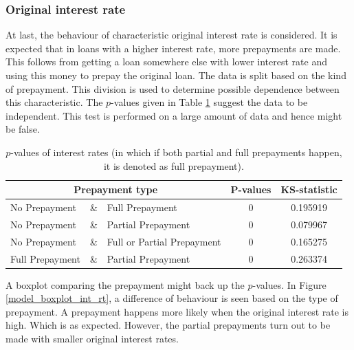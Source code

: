 \subsubsection{Original interest rate}
    At last, the behaviour of characteristic original interest rate is 
    considered. It is expected that in loans with a higher interest 
    rate, more prepayments are made. This follows from getting a 
    loan somewhere else with lower interest rate and using this 
    money to prepay the original loan. The data is split based 
    on the kind of prepayment. This division is used to determine 
    possible dependence between this characteristic. The $p$-values 
    given in Table \ref{model_Pvals_of_int} suggest the data to 
    be independent. This test is performed on a large amount of 
    data and hence might be false. 
    \begin{table}[H]
        \centering
            \begin{tabular}{lcl|c|c}
                \multicolumn{3}{c|}{Prepayment type} & P-values& KS-statistic \\\hline
                No Prepayment & \& & Full Prepayment & 0 & 0.195919\\
                No Prepayment & \& & Partial Prepayment & 0 & 0.079967\\
                No Prepayment & \& & Full or Partial Prepayment & 0 & 0.165275 \\
                Full Prepayment & \& & Partial Prepayment & 0 & 0.263374
		    \end{tabular}
            \caption{
                $p$-values of interest rates (in which if both partial 
                and full prepayments happen, it is denoted as full 
                prepayment).
                }
	        \label{model_Pvals_of_int}
        \end{table}
    A boxplot comparing the prepayment might back up the $p$-values. 
    In Figure \ref{model_boxplot_int_rt}, a difference of behaviour 
    is seen based on the type of prepayment. A prepayment happens 
    more likely when the original interest rate is high. Which is 
    as expected. However, the partial prepayments turn out to be 
    made with smaller original interest rates. 
